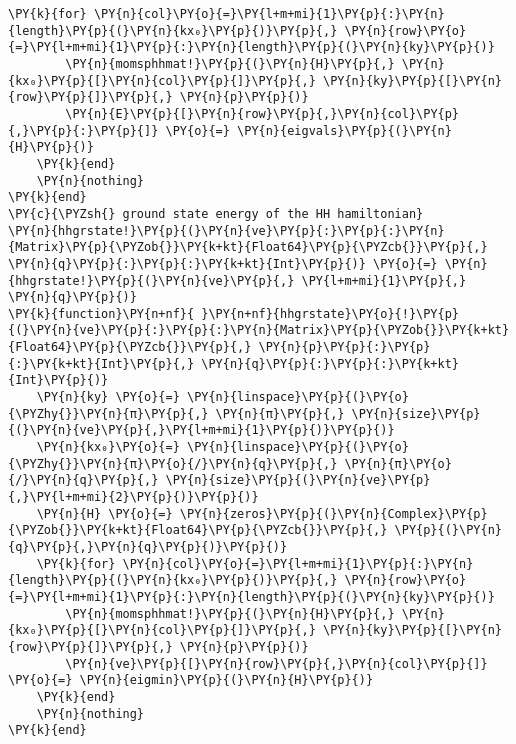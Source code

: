 \begin{Verbatim}[commandchars=\\\{\}]
    \PY{k}{for} \PY{n}{col}\PY{o}{=}\PY{l+m+mi}{1}\PY{p}{:}\PY{n}{length}\PY{p}{(}\PY{n}{kx₀}\PY{p}{)}\PY{p}{,} \PY{n}{row}\PY{o}{=}\PY{l+m+mi}{1}\PY{p}{:}\PY{n}{length}\PY{p}{(}\PY{n}{ky}\PY{p}{)}
        \PY{n}{momsphhmat!}\PY{p}{(}\PY{n}{H}\PY{p}{,} \PY{n}{kx₀}\PY{p}{[}\PY{n}{col}\PY{p}{]}\PY{p}{,} \PY{n}{ky}\PY{p}{[}\PY{n}{row}\PY{p}{]}\PY{p}{,} \PY{n}{p}\PY{p}{)}
        \PY{n}{E}\PY{p}{[}\PY{n}{row}\PY{p}{,}\PY{n}{col}\PY{p}{,}\PY{p}{:}\PY{p}{]} \PY{o}{=} \PY{n}{eigvals}\PY{p}{(}\PY{n}{H}\PY{p}{)}
    \PY{k}{end}
    \PY{n}{nothing}
\PY{k}{end}
\PY{c}{\PYZsh{} ground state energy of the HH hamiltonian}
\PY{n}{hhgrstate!}\PY{p}{(}\PY{n}{ve}\PY{p}{:}\PY{p}{:}\PY{n}{Matrix}\PY{p}{\PYZob{}}\PY{k+kt}{Float64}\PY{p}{\PYZcb{}}\PY{p}{,} \PY{n}{q}\PY{p}{:}\PY{p}{:}\PY{k+kt}{Int}\PY{p}{)} \PY{o}{=} \PY{n}{hhgrstate!}\PY{p}{(}\PY{n}{ve}\PY{p}{,} \PY{l+m+mi}{1}\PY{p}{,} \PY{n}{q}\PY{p}{)}
\PY{k}{function}\PY{n+nf}{ }\PY{n+nf}{hhgrstate}\PY{o}{!}\PY{p}{(}\PY{n}{ve}\PY{p}{:}\PY{p}{:}\PY{n}{Matrix}\PY{p}{\PYZob{}}\PY{k+kt}{Float64}\PY{p}{\PYZcb{}}\PY{p}{,} \PY{n}{p}\PY{p}{:}\PY{p}{:}\PY{k+kt}{Int}\PY{p}{,} \PY{n}{q}\PY{p}{:}\PY{p}{:}\PY{k+kt}{Int}\PY{p}{)}
    \PY{n}{ky} \PY{o}{=} \PY{n}{linspace}\PY{p}{(}\PY{o}{\PYZhy{}}\PY{n}{π}\PY{p}{,} \PY{n}{π}\PY{p}{,} \PY{n}{size}\PY{p}{(}\PY{n}{ve}\PY{p}{,}\PY{l+m+mi}{1}\PY{p}{)}\PY{p}{)}
    \PY{n}{kx₀}\PY{o}{=} \PY{n}{linspace}\PY{p}{(}\PY{o}{\PYZhy{}}\PY{n}{π}\PY{o}{/}\PY{n}{q}\PY{p}{,} \PY{n}{π}\PY{o}{/}\PY{n}{q}\PY{p}{,} \PY{n}{size}\PY{p}{(}\PY{n}{ve}\PY{p}{,}\PY{l+m+mi}{2}\PY{p}{)}\PY{p}{)}
    \PY{n}{H} \PY{o}{=} \PY{n}{zeros}\PY{p}{(}\PY{n}{Complex}\PY{p}{\PYZob{}}\PY{k+kt}{Float64}\PY{p}{\PYZcb{}}\PY{p}{,} \PY{p}{(}\PY{n}{q}\PY{p}{,}\PY{n}{q}\PY{p}{)}\PY{p}{)}
    \PY{k}{for} \PY{n}{col}\PY{o}{=}\PY{l+m+mi}{1}\PY{p}{:}\PY{n}{length}\PY{p}{(}\PY{n}{kx₀}\PY{p}{)}\PY{p}{,} \PY{n}{row}\PY{o}{=}\PY{l+m+mi}{1}\PY{p}{:}\PY{n}{length}\PY{p}{(}\PY{n}{ky}\PY{p}{)}
        \PY{n}{momsphhmat!}\PY{p}{(}\PY{n}{H}\PY{p}{,} \PY{n}{kx₀}\PY{p}{[}\PY{n}{col}\PY{p}{]}\PY{p}{,} \PY{n}{ky}\PY{p}{[}\PY{n}{row}\PY{p}{]}\PY{p}{,} \PY{n}{p}\PY{p}{)}
        \PY{n}{ve}\PY{p}{[}\PY{n}{row}\PY{p}{,}\PY{n}{col}\PY{p}{]} \PY{o}{=} \PY{n}{eigmin}\PY{p}{(}\PY{n}{H}\PY{p}{)}
    \PY{k}{end}
    \PY{n}{nothing}
\PY{k}{end}


\end{Verbatim}
